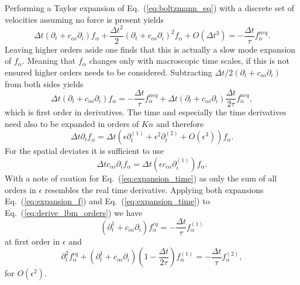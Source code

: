 Performing a Taylor expansion of Eq.~(\ref{eq:boltzmann_eq}) with a discrete set of velocities assuming no force is present yields~\cite{krugerLatticeBoltzmannMethod2017}
\begin{equation}\label{eq:Taylor_discret_boltzmann}
    \Delta t (\partial_t + c_{\alpha i}\partial_i)f_{\alpha} + \frac{\Delta t^2}{2}(\partial_t + c_{\alpha i}\partial_i)^2 f_{\alpha} + O(\Delta t^3) = -\frac{\Delta t}{\tau} f_{\alpha}^{neq}.
\end{equation}
Leaving higher orders aside one finds that this is actually a slow mode expansion of $f_{\alpha}$.
Meaning that $f_{\alpha}$ changes only with macroscopic time scales, if this is not ensured higher orders needs to be considered.
Subtracting $\Delta t/2 (\partial_t + c_{\alpha i}\partial_i)$ from both sides yields
\begin{equation}\label{eq:derive_lbm_orders}
    \Delta t (\partial_t + c_{\alpha i}\partial_i)f_{\alpha} = -\frac{\Delta t}{\tau} f_{\alpha}^{neq} + \Delta t (\partial_t + c_{\alpha i}\partial_i)\frac{\Delta t}{2\tau} f^{neq}_{\alpha},
\end{equation}
which is first order in derivatives.
The time and especially the time derivatives need also to be expanded in orders of $Kn$ and therefore
\begin{equation}\label{eq:expansion_time}
    \Delta t \partial_t f_{\alpha} = \Delta t (\epsilon\partial_t^{(1)} + \epsilon^2\partial_t^{(2)} + O(\epsilon^3)) f_{\alpha}.
\end{equation}
For the spatial deviates it is sufficient to use
\begin{equation}\label{eq:expansion_space}
    \Delta t c_{\alpha i}\partial_i f_{\alpha} = \Delta t(\epsilon c_{\alpha i}\partial_i^{(1)}) f_{\alpha}.
\end{equation}
With a note of caution for Eq.~(\ref{eq:expansion_time}) as only the sum of all orders in $\epsilon$ resembles the real time derivative.
Applying both expansions Eq.~(\ref{eq:expansion_f}) and Eq.~(\ref{eq:expansion_time}) to Eq.~(\ref{eq:derive_lbm_orders}) we have
\begin{equation}\label{eq:first_order_esp}
    (\partial_t^{1} + c_{\alpha i}\partial_{i}) f_{\alpha}^{eq} = -\frac{\Delta t}{\tau} f_{\alpha}^{(1)}
\end{equation}
at first order in $\epsilon$ and 
\begin{equation}\label{eq:sec_order_esp}
    \partial_t^{2} f_{\alpha}^{eq} + (\partial_t^{1} + c_{\alpha i}\partial_{i})\left(1 - \frac{\Delta t}{2\tau}\right) f_{\alpha}^{(1)} = -\frac{\Delta t}{\tau} f_{\alpha}^{(2)},
\end{equation}
for $O(\epsilon^2)$.

